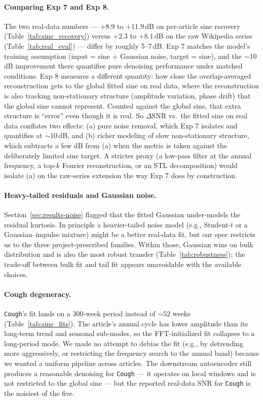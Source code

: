 \documentclass[11pt]{article}
\begin{document}
\paragraph{Comparing Exp 7 and Exp 8.}
The two real-data numbers --- $+8.9$ to $+11.9$\,dB on per-article sine recovery (Table~\ref{tab:sine_recovery}) versus $+2.3$ to $+8.1$\,dB on the raw Wikipedia series (Table~\ref{tab:real_eval}) --- differ by roughly 5--7\,dB. Exp 7 matches the model's training assumption (input = sine $+$ Gaussian noise, target = sine), and the $\sim$10\,dB improvement there quantifies pure denoising performance under matched conditions. Exp 8 measures a different quantity: how close the overlap-averaged reconstruction gets to the global fitted sine on real data, where the reconstruction is also tracking non-stationary structure (amplitude variation, phase drift) that the global sine cannot represent. Counted against the global sine, that extra structure is ``error'' even though it is real. So $\Delta$SNR vs.\ the fitted sine on real data conflates two effects: (a) pure noise removal, which Exp 7 isolates and quantifies at $\sim$10\,dB, and (b) richer modeling of slow non-stationary structure, which subtracts a few dB from (a) when the metric is taken against the deliberately limited sine target. A stricter proxy (a low-pass filter at the annual frequency, a top-$k$ Fourier reconstruction, or an STL decomposition) would isolate (a) on the raw-series extension the way Exp 7 does by construction.

\paragraph{Heavy-tailed residuals and Gaussian noise.}
Section~\ref{sec:results-noise} flagged that the fitted Gaussian under-models the residual kurtosis. In principle a heavier-tailed noise model (e.g., Student-$t$ or a Gaussian--impulse mixture) might be a better real-data fit, but our spec restricts us to the three project-prescribed families. Within those, Gaussian wins on bulk distribution and is also the most robust transfer (Table~\ref{tab:robustness}); the trade-off between bulk fit and tail fit appears unavoidable with the available choices.

\paragraph{Cough degeneracy.}
\texttt{Cough}'s fit lands on a 300-week period instead of $\sim 52$ weeks (Table~\ref{tab:sine_fits}). The article's annual cycle has lower amplitude than its long-term trend and seasonal sub-modes, so the FFT-initialized fit collapses to a long-period mode. We made no attempt to debias the fit (e.g., by detrending more aggressively, or restricting the frequency search to the annual band) because we wanted a uniform pipeline across articles. The downstream autoencoder still produces a reasonable denoising for \texttt{Cough} --- it operates on local windows and is not restricted to the global sine --- but the reported real-data SNR for \texttt{Cough} is the noisiest of the five.
\end{document}
